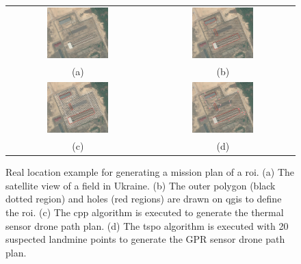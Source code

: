 \begin{figure}[h!]
    \centering
    \begin{tabular}{cc}
        \includegraphics[width=0.45\textwidth]{figs/Jihwan/map1.pdf} &
        \includegraphics[width=0.45\textwidth]{figs/Jihwan/map2.pdf} \\
        (a) & (b) \\[10pt]
        \includegraphics[width=0.45\textwidth]{figs/Jihwan/map3.pdf} &
        \includegraphics[width=0.45\textwidth]{figs/Jihwan/map4.pdf} \\
        (c) & (d)
    \end{tabular}
    \caption[Real Location Example for Mission Planning]
    {Real location example for generating a mission plan of a \gls{roi}. (a) The satellite view of a field in Ukraine. (b) The outer polygon (black dotted region) and holes (red regions) are drawn on \gls{qgis} to define the \gls{roi}. (c) The \gls{cpp} algorithm is executed to generate the thermal sensor drone path plan. (d) The \gls{tspo} algorithm is executed with 20 suspected landmine points to generate the \gls{GPR} sensor drone path plan. 
    }
    \label{fig:msp_example}
\end{figure}

